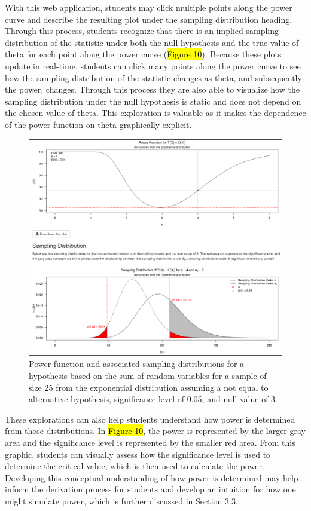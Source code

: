 \documentclass{TISE}
\begin{document}
With this web application, students may click multiple points along the power curve and describe the resulting plot under the sampling distribution heading. Through this process, students recognize that there is an implied sampling distribution of the statistic under both the null hypothesis and the true value of theta for each point along the power curve (\hl{Figure 10}). Because these plots update in real-time, students can click many points along the power curve to see how the sampling distribution of the statistic changes as theta, and subsequently the power, changes. Through this process they are also able to visualize how the sampling distribution under the null hypothesis is static and does not depend on the chosen value of theta. This exploration is valuable as it makes the dependence of the power function on theta graphically explicit.

\begin{figure}[H]
	\centering
	\includegraphics[scale=1]{reactive.png}
	\caption{Power function and associated sampling distributions for a hypothesis based on the sum of random variables for a sample of size 25 from the exponential distribution assuming a not equal to alternative hypothesis, significance level of 0.05, and null value of 3.}
\end{figure}

These explorations can also help students understand how power is determined from those distributions. In \hl{Figure 10}, the power is represented by the larger gray area and the significance level is represented by the smaller red area. From this graphic, students can visually assess how the significance level is used to determine the critical value, which is then used to calculate the power. Developing this conceptual understanding of how power is determined may help inform the derivation process for students and develop an intuition for how one might simulate power, which is further discussed in Section 3.3.
\end{document}
